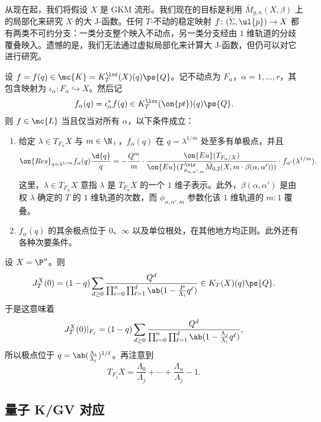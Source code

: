 从现在起，我们将假设 \(X\) 是 GKM 流形。我们现在的目标是利用 \(\bar{M}_{g,n}(X, \beta)\) 上的局部化来研究 \(X\) 的大 J-函数。任何 \(T\)-不动的稳定映射 \(f \colon (\Sigma, \ul{p}) \to X\) 都有两类不可约分支：一类分支整个映入不动点，另一类分支经由 \(1\) 维轨道的分歧覆叠映入。遗憾的是，我们无法通过虚拟局部化来计算大 J-函数，但仍可以对它进行研究。

设 \(f = f(q) \in \mc{K} = K_T^{\loc}(X)(q)\ps{Q}\)。记不动点为 \(F_{\alpha}\)，\(\alpha = 1, \ldots, r\)，其包含映射为 \(\iota_{\alpha} \colon F_{\alpha} \hookrightarrow X\)。然后记
\[ f_{\alpha}(q) = \iota_{\alpha}^* f(q) \in K_T^{\loc}(\on{pt})(q)\ps{Q}. \]
则 \(f \in \mc{L}\) 当且仅当对所有 \(\alpha\)，以下条件成立：
\begin{enumerate}
    \item 给定 \(\lambda \in T_{F_{\alpha}} X\) 与 \(m \in \N_+\)，\(f_{\alpha}(q)\) 在 \(q = \lambda^{1/m}\) 处至多有单极点，并且
        \[ \on{Res}_{q = \lambda^{1/m}} f_{\alpha}(q) \frac{\d{q}}{q} = -\frac{Q^m}{m} \cdot \frac{\on{Eu}(T_{F_{\alpha}/X})}{\on{Eu}(T^{\vir}_{\phi_{\alpha,\alpha',m}}\bar{M}_{0,2}(X, m \cdot \beta(\alpha, \alpha')))} \cdot f_{\alpha'}(\lambda^{1/m}). \]
        这里，\(\lambda \in T_{F_{\alpha}}X\) 意指 \(\lambda\) 是 \(T_{F_{\alpha}} X\) 的一个 \(1\) 维子表示。此外，\(\beta(\alpha,\alpha')\) 是由权 \(\lambda\) 确定的 \(T\) 的 \(1\) 维轨道的次数，而 \(\phi_{\alpha, \alpha', m}\) 参数化该 \(1\) 维轨道的 \(m:1\) 覆叠。
    \item \(f_{\alpha}(q)\) 的其余极点位于 \(0\)、\(\infty\) 以及单位根处，在其他地方均正则。此外还有各种次要条件。
\end{enumerate}

\begin{exm}
    设 \(X = \P^n\)。则
    \[ J_T^X(0) = (1-q) \sum_{d \geq 0} \frac{Q^d}{\prod_{i=0}^n \prod_{\ell = 1}^d \ab(1 - \frac{P}{\Lambda_i} q^{\ell})} \in K_T(X)(q) \ps{Q}. \]
    于是这意味着
    \[ J_T^X(0) |_{F_j} = (1-q) \sum_{d \geq 0} \frac{Q^d}{\prod_{i=0}^n \prod_{\ell = 1}^d \ab(1 - \frac{\Lambda_j}{\Lambda_i}q^{\ell})}, \]
    所以极点位于 \(q = \ab(\frac{\Lambda_i}{\Lambda_j})^{1/\ell}\)。再注意到
    \[ T_{F_j} X = \frac{\Lambda_0}{\Lambda_j} + \cdots + \frac{\Lambda_n}{\Lambda_j} - 1. \]
\end{exm}

\subsection{量子 K/GV 对应}%
\label{sub:Quantum K/GV correspondence}

